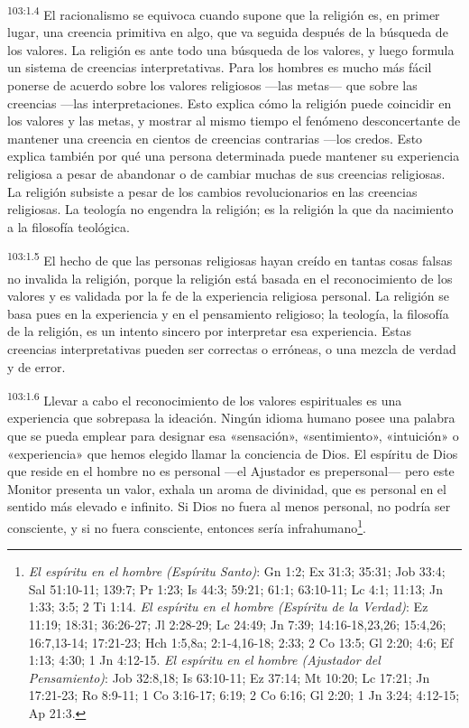 \par
\textsuperscript{103:1.4} El racionalismo se equivoca cuando supone que la religión es, en primer lugar, una creencia primitiva en algo, que va seguida después de la búsqueda de los valores. La religión es ante todo una búsqueda de los valores, y luego formula un sistema de creencias interpretativas. Para los hombres es mucho más fácil ponerse de acuerdo sobre los valores religiosos ---las metas--- que sobre las creencias ---las interpretaciones. Esto explica cómo la religión puede coincidir en los valores y las metas, y mostrar al mismo tiempo el fenómeno desconcertante de mantener una creencia en cientos de creencias contrarias ---los credos. Esto explica también por qué una persona determinada puede mantener su experiencia religiosa a pesar de abandonar o de cambiar muchas de sus creencias religiosas. La religión subsiste a pesar de los cambios revolucionarios en las creencias religiosas. La teología no engendra la religión; es la religión la que da nacimiento a la filosofía teológica.

\par
\textsuperscript{103:1.5} El hecho de que las personas religiosas hayan creído en tantas cosas falsas no invalida la religión, porque la religión está basada en el reconocimiento de los valores y es validada por la fe de la experiencia religiosa personal. La religión se basa pues en la experiencia y en el pensamiento religioso; la teología, la filosofía de la religión, es un intento sincero por interpretar esa experiencia. Estas creencias interpretativas pueden ser correctas o erróneas, o una mezcla de verdad y de error.

\par
\textsuperscript{103:1.6} Llevar a cabo el reconocimiento de los valores espirituales es una experiencia que sobrepasa la ideación. Ningún idioma humano posee una palabra que se pueda emplear para designar esa «sensación», «sentimiento», «intuición» o «experiencia» que hemos elegido llamar la conciencia de Dios. El espíritu de Dios que reside en el hombre no es personal ---el Ajustador es prepersonal--- pero este Monitor presenta un valor, exhala un aroma de divinidad, que es personal en el sentido más elevado e infinito. Si Dios no fuera al menos personal, no podría ser consciente, y si no fuera consciente, entonces sería infrahumano\footnote{\textit{El espíritu en el hombre (Espíritu Santo)}: Gn 1:2; Ex 31:3; 35:31; Job 33:4; Sal 51:10-11; 139:7; Pr 1:23; Is 44:3; 59:21; 61:1; 63:10-11; Lc 4:1; 11:13; Jn 1:33; 3:5; 2 Ti 1:14. \textit{El espíritu en el hombre (Espíritu de la Verdad)}: Ez 11:19; 18:31; 36:26-27; Jl 2:28-29; Lc 24:49; Jn 7:39; 14:16-18,23,26; 15:4,26; 16:7,13-14; 17:21-23; Hch 1:5,8a; 2:1-4,16-18; 2:33; 2 Co 13:5; Gl 2:20; 4:6; Ef 1:13; 4:30; 1 Jn 4:12-15. \textit{El espíritu en el hombre (Ajustador del Pensamiento)}: Job 32:8,18; Is 63:10-11; Ez 37:14; Mt 10:20; Lc 17:21; Jn 17:21-23; Ro 8:9-11; 1 Co 3:16-17; 6:19; 2 Co 6:16; Gl 2:20; 1 Jn 3:24; 4:12-15; Ap 21:3.}.

